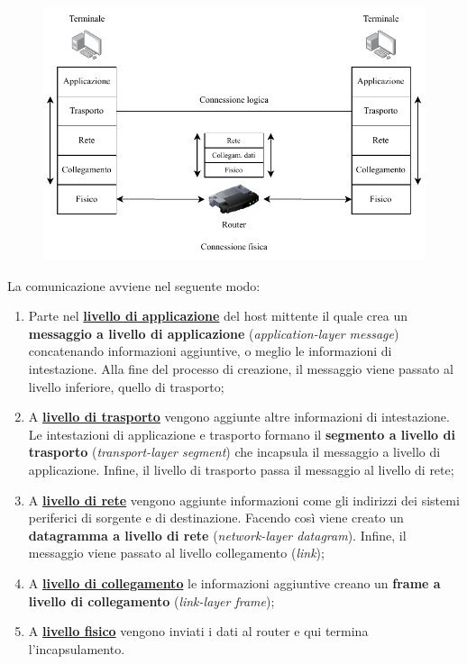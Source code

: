 \documentclass[a4paper]{article}
\begin{document}
	\begin{figure}[!htp]
		\centering
		\includegraphics[width=\textwidth]{img/incapsulamento.pdf}
	\end{figure}

	La comunicazione avviene nel seguente modo:
	
	\begin{enumerate}
		\item Parte nel \textbf{\underline{livello di applicazione}} del host mittente il quale crea un \textbf{messaggio a livello di applicazione} (\emph{application-layer message}) concatenando informazioni aggiuntive, o meglio le informazioni di intestazione. Alla fine del processo di creazione, il messaggio viene passato al livello inferiore, quello di trasporto;
		
		\item A \textbf{\underline{livello di trasporto}} vengono aggiunte altre informazioni di intestazione. Le intestazioni di applicazione e trasporto formano il \textbf{segmento a livello di trasporto} (\emph{transport-layer segment}) che incapsula il messaggio a livello di applicazione. Infine, il livello di trasporto passa il messaggio al livello di rete;
		
		\item A \textbf{\underline{livello di rete}} vengono aggiunte informazioni come gli indirizzi dei sistemi periferici di sorgente e di destinazione. Facendo così viene creato un \textbf{datagramma a livello di rete} (\emph{network-layer datagram}). Infine, il messaggio viene passato al livello collegamento (\emph{link});
		
		\item A \textbf{\underline{livello di collegamento}} le informazioni aggiuntive creano un \textbf{frame a livello di collegamento} (\emph{link-layer frame});
		
		\item A \textbf{\underline{livello fisico}} vengono inviati i dati al router e qui termina l'incapsulamento.
	\end{enumerate}
\end{document}
